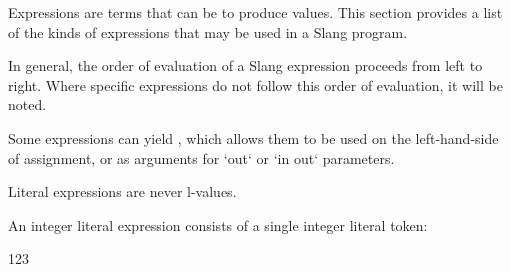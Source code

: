 
Expressions are terms that can be  to produce values.
This section provides a list of the kinds of expressions that may be used in a Slang program.

In general, the order of evaluation of a Slang expression proceeds from left to right.
Where specific expressions do not follow this order of evaluation, it will be noted.

Some expressions can yield , which allows them to be used on the left-hand-side of assignment, or as arguments for `out` or `in out` parameters.


Literal expressions are never l-values.


An integer literal expression consists of a single integer literal token:

\begin{codeblock}
123
\end{codeblock}

